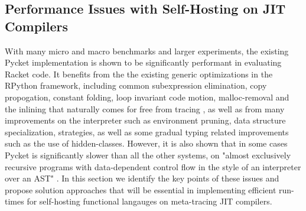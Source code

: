 \vspace{-0.25cm}

\subsection{Performance Issues with Self-Hosting on JIT Compilers}
\label{subsec:performance}

With many micro and macro benchmarks and larger experiments, the
existing Pycket implementation is shown to be significantly performant
in evaluating Racket code. It benefits from the the existing generic
optimizations in the RPython framework, including common subexpression
elimination, copy propogation, constant folding, loop invariant code
motion, malloc-removal and the inlining that naturally comes for free
from tracing \cite{loop-aware:12, hotpath:06, malloc-removal:11}, as
well as from many improvements on the interpreter such as environment
pruning, data structure specialization, strategies, as well as some
gradual typing related improvements such as the use of
hidden-classes. However, it is also shown that in some cases Pycket is
significantly slower than all the other systems, on "almost
exclusively recursive programs with data-dependent control flow in the
style of an interpreter over an AST" \cite{pycket15, pycket17}. In
this section we identify the key points of these issues and propose
solution approaches that will be essential in implementing efficient
run-times for self-hosting functional langauges on meta-tracing JIT
compilers.

